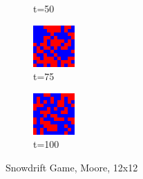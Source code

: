 \documentclass[a4paper, 11pt]{article}
\begin{document}
\begin{figure}[H]
\begin{subfigure}{.25\textwidth}
  \caption{t=50}
\end{subfigure}%
\begin{subfigure}{.25\textwidth}
  \centering
  \includegraphics[width=0.9\linewidth]{SNOWDRIFT_MOORE_12x12_t75}
  \caption{t=75}
\end{subfigure}%
\begin{subfigure}{.25\textwidth}
  \centering
  \includegraphics[width=0.9\linewidth]{SNOWDRIFT_MOORE_12x12_t100}
  \caption{t=100}
\end{subfigure}
\caption{Snowdrift Game, Moore, 12x12}
\end{figure}
\end{document}
